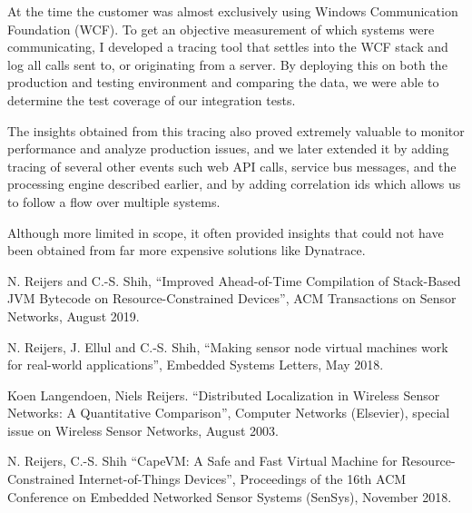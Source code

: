 \documentclass[10pt,a4paper]{../altacv}
\begin{document}
\begin{fullwidth}
\medskip

At the time the customer was almost exclusively using Windows Communication Foundation (WCF). To get an objective measurement of which systems were communicating, I developed a tracing tool that settles into the WCF stack and log all calls sent to, or originating from a server. By deploying this on both the production and testing environment and comparing the data, we were able to determine the test coverage of our integration tests.

\medskip

The insights obtained from this tracing also proved extremely valuable to monitor performance and analyze production issues, and we later extended it by adding tracing of several other events such web API calls, service bus messages, and the processing engine described earlier, and by adding correlation ids which allows us to follow a flow over multiple systems.

\medskip

Although more limited in scope, it often provided insights that could not have been obtained from far more expensive solutions like Dynatrace.




\newpage



N. Reijers and C.-S. Shih, “Improved Ahead-of-Time Compilation of Stack-Based JVM Bytecode on Resource-Constrained Devices”, ACM Transactions on Sensor Networks, August 2019.

\medskip\medskip

N. Reijers, J. Ellul and C.-S. Shih, “Making sensor node virtual machines work for real-world applications”, Embedded Systems Letters, May 2018.

\medskip\medskip

Koen Langendoen, Niels Reijers. “Distributed Localization in Wireless Sensor Networks: A Quantitative Comparison”, Computer Networks (Elsevier), special issue on Wireless Sensor Networks, August 2003.

\bigskip\bigskip


N. Reijers, C.-S. Shih “CapeVM: A Safe and Fast Virtual Machine for Resource-Constrained Internet-of-Things Devices”, Proceedings of the 16th ACM Conference on Embedded Networked Sensor Systems (SenSys), November 2018.


\end{fullwidth}
\end{document}
